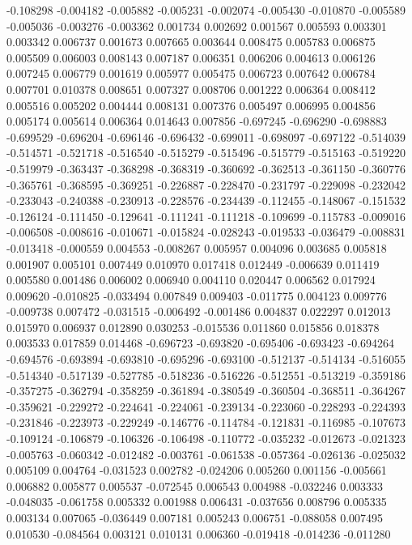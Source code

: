 -0.108298
-0.004182
-0.005882
-0.005231
-0.002074
-0.005430
-0.010870
-0.005589
-0.005036
-0.003276
-0.003362
0.001734
0.002692
0.001567
0.005593
0.003301
0.003342
0.006737
0.001673
0.007665
0.003644
0.008475
0.005783
0.006875
0.005509
0.006003
0.008143
0.007187
0.006351
0.006206
0.004613
0.006126
0.007245
0.006779
0.001619
0.005977
0.005475
0.006723
0.007642
0.006784
0.007701
0.010378
0.008651
0.007327
0.008706
0.001222
0.006364
0.008412
0.005516
0.005202
0.004444
0.008131
0.007376
0.005497
0.006995
0.004856
0.005174
0.005614
0.006364
0.014643
0.007856
-0.697245
-0.696290
-0.698883
-0.699529
-0.696204
-0.696146
-0.696432
-0.699011
-0.698097
-0.697122
-0.514039
-0.514571
-0.521718
-0.516540
-0.515279
-0.515496
-0.515779
-0.515163
-0.519220
-0.519979
-0.363437
-0.368298
-0.368319
-0.360692
-0.362513
-0.361150
-0.360776
-0.365761
-0.368595
-0.369251
-0.226887
-0.228470
-0.231797
-0.229098
-0.232042
-0.233043
-0.240388
-0.230913
-0.228576
-0.234439
-0.112455
-0.148067
-0.151532
-0.126124
-0.111450
-0.129641
-0.111241
-0.111218
-0.109699
-0.115783
-0.009016
-0.006508
-0.008616
-0.010671
-0.015824
-0.028243
-0.019533
-0.036479
-0.008831
-0.013418
-0.000559
0.004553
-0.008267
0.005957
0.004096
0.003685
0.005818
0.001907
0.005101
0.007449
0.010970
0.017418
0.012449
-0.006639
0.011419
0.005580
0.001486
0.006002
0.006940
0.004110
0.020447
0.006562
0.017924
0.009620
-0.010825
-0.033494
0.007849
0.009403
-0.011775
0.004123
0.009776
-0.009738
0.007472
-0.031515
-0.006492
-0.001486
0.004837
0.022297
0.012013
0.015970
0.006937
0.012890
0.030253
-0.015536
0.011860
0.015856
0.018378
0.003533
0.017859
0.014468
-0.696723
-0.693820
-0.695406
-0.693423
-0.694264
-0.694576
-0.693894
-0.693810
-0.695296
-0.693100
-0.512137
-0.514134
-0.516055
-0.514340
-0.517139
-0.527785
-0.518236
-0.516226
-0.512551
-0.513219
-0.359186
-0.357275
-0.362794
-0.358259
-0.361894
-0.380549
-0.360504
-0.368511
-0.364267
-0.359621
-0.229272
-0.224641
-0.224061
-0.239134
-0.223060
-0.228293
-0.224393
-0.231846
-0.223973
-0.229249
-0.146776
-0.114784
-0.121831
-0.116985
-0.107673
-0.109124
-0.106879
-0.106326
-0.106498
-0.110772
-0.035232
-0.012673
-0.021323
-0.005763
-0.060342
-0.012482
-0.003761
-0.061538
-0.057364
-0.026136
-0.025032
0.005109
0.004764
-0.031523
0.002782
-0.024206
0.005260
0.001156
-0.005661
0.006882
0.005877
0.005537
-0.072545
0.006543
0.004988
-0.032246
0.003333
-0.048035
-0.061758
0.005332
0.001988
0.006431
-0.037656
0.008796
0.005335
0.003134
0.007065
-0.036449
0.007181
0.005243
0.006751
-0.088058
0.007495
0.010530
-0.084564
0.003121
0.010131
0.006360
-0.019418
-0.014236
-0.011280
